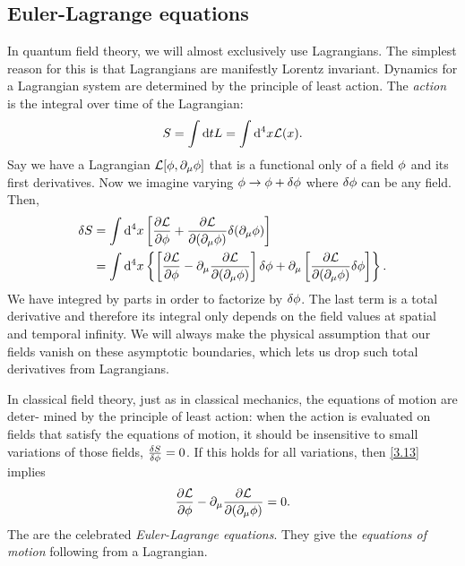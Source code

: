 \subsection{Euler-Lagrange equations}
In quantum field theory, we will almost exclusively use Lagrangians. The simplest reason for this is that Lagrangians are manifestly Lorentz invariant. Dynamics for a Lagrangian system are determined by the principle of least action. The \textit{action} is the integral over time of the Lagrangian:
\begin{equation}
  S=\int\dd tL=\int\dd^4x\mathcal{L}(x).
\end{equation}
Say we have a Lagrangian $\mathcal{L}[\phi,\partial_\mu\phi ]$ that is a functional only of a field $\phi$ and its first derivatives. Now we imagine varying $\phi\to\phi+\delta\phi $ where $\delta\phi $ can be any field. Then, 
\begin{align}
  \delta S&=\int\dd^4x\left[\pdv{\mathcal{L}}{\phi}+\pdv{\mathcal{L}}{(\partial_\mu\phi)}\delta(\partial_\mu\phi )\right] \nonumber\\
  &=\int\dd^4x\left\{\left[\pdv{\mathcal{L}}{\phi}-\partial_\mu \pdv{\mathcal{L}}{(\partial_\mu\phi)}\right]\delta\phi +\partial_\mu \left[\pdv{\mathcal{L}}{(\partial_\mu\phi)}\delta\phi \right]\right\}. \label{3.13}
\end{align}
We have integred by parts in order to factorize by $\delta\phi$. The last term is a total derivative and therefore its integral only depends on the field values at spatial and temporal infinity. We will always make the physical assumption that our fields vanish on these asymptotic boundaries, which lets us drop such total derivatives from Lagrangians.

In classical field theory, just as in classical mechanics, the equations of motion are deter- mined by the principle of least action: when the action is evaluated on fields that satisfy the equations of motion, it should be insensitive to small variations of those fields, $\frac{\delta S}{\delta\phi }=0$. If this holds for all variations, then \eqref{3.13} implies
\begin{equation}\label{3.15}
  \pdv{\mathcal{L}}{\phi}-\partial_\mu \pdv{\mathcal{L}}{(\partial_\mu\phi)}=0.
\end{equation}
The are the celebrated \textit{Euler-Lagrange equations}. They give the \textit{equations of motion} following from a Lagrangian.

